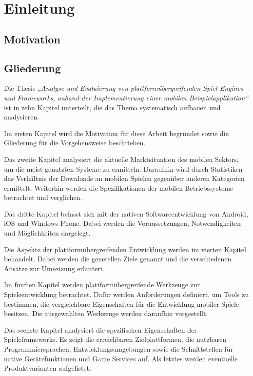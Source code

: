 
\chapter{Einleitung}

\section{Motivation}
\section{Gliederung}
Die Thesis \emph{„Analyse und Evaluierung von plattformübergreifenden Spiel-Engines und Frameworks, anhand der Implementierung einer mobilen Beispielapplikation“} ist in zehn Kapitel unterteilt, die das Thema systematisch aufbauen und analysieren.

\bigskip
Im ersten Kapitel wird die Motivation für diese Arbeit begründet sowie die Gliederung für die Vorgehensweise beschrieben.

\bigskip
Das zweite Kapitel analysiert die aktuelle Marktsituation des mobilen Sektors, um die meist genutzten Systeme zu ermitteln. Daraufhin wird durch Statistiken das Verhältnis der Downloads an mobilen Spielen gegenüber anderen Kategorien ermittelt. Weiterhin werden die Spezifikationen der mobilen Betriebssysteme betrachtet und verglichen. 

\bigskip
Das dritte Kapitel befasst sich mit der nativen Softwareentwicklung von Android, iOS und Windows Phone. Dabei werden die Voraussetzungen, Notwendigkeiten und Möglichkeiten dargelegt.

\bigskip
Die Aspekte der plattformübergreifenden Entwicklung werden im vierten Kapitel behandelt. Dabei werden die generellen Ziele genannt und die verschiedenen Ansätze zur Umsetzung erläutert. 

\bigskip
Im fünften Kapitel werden plattformübergreifende Werkzeuge zur Spieleentwicklung betrachtet. Dafür werden Anforderungen definiert, um Tools zu bestimmen, die vergleichbare Eigenschaften für die Entwicklung mobiler Spiele besitzen. Die ausgewählten Werkzeuge werden daraufhin vorgestellt.

\bigskip
Das sechste Kapitel analysiert die spezifischen Eigenschaften der Spieleframeworks. Es zeigt die erreichbaren Zielplattformen, die nutzbaren Programmiersprachen, Entwicklungsumgebungen sowie die Schnittstellen für native Gerätefunktionen und Game Services auf. Als letztes werden eventuelle Produktvarianten aufgelistet.

